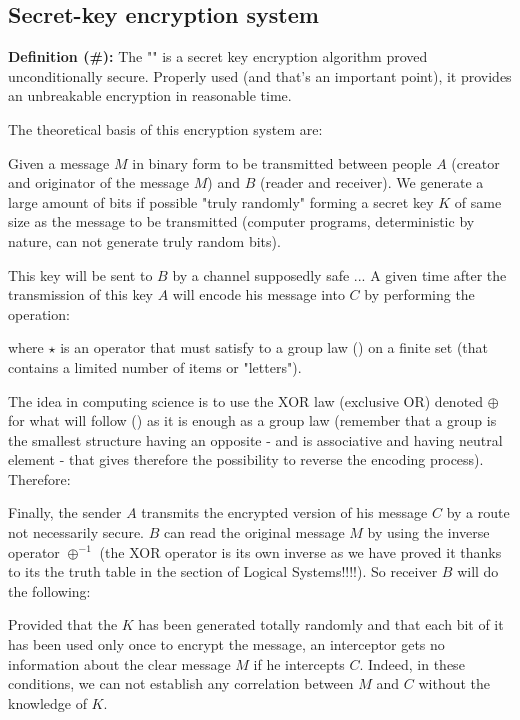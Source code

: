 	\subsection{Secret-key encryption system}
	\textbf{Definition (\#\mydef):} The "" is a secret key encryption algorithm proved unconditionally secure. Properly used (and that's an important point), it provides an unbreakable encryption in reasonable time.
	
	The theoretical basis of this encryption system are:
	
	Given a message $M$ in binary form to be transmitted between people $A$ (creator and originator of the message $M$) and $B$ (reader and receiver). We generate a large amount of bits if possible "truly randomly" forming a secret key $K$ of same size as the message to be transmitted (computer programs, deterministic by nature, can not generate truly random bits).
	
	This key will be sent to $B$ by a channel supposedly safe ... A given time after the transmission of this key $A$ will encode his message into $C$ by performing the operation:
	
	where $\star$ is an operator that must satisfy to a group law () on a finite set (that contains a limited number of items or "letters").
	
	The idea in computing science is to use the XOR law (exclusive OR) denoted $\oplus$ for what will follow () as it is enough as a group law (remember that a group is the smallest structure having an opposite - and is associative and having neutral element - that gives therefore the possibility to reverse the encoding process). Therefore:
	
	Finally, the sender $A$ transmits the encrypted version of his message $C$ by a route not necessarily secure. $B$ can read the original message $M$ by using the inverse operator $\oplus^{-1}$ (the XOR operator is its own inverse as we have proved it thanks to its the truth table in the section of Logical Systems!!!!). So receiver $B$ will do the following:
	
	Provided that the $K$ has been generated totally randomly and that each bit of it has been used only once to encrypt the message, an interceptor gets no information about the clear message $M$ if he intercepts $C$. Indeed, in these conditions, we can not establish any correlation between $M$ and $C$ without the knowledge of $K$.
	
